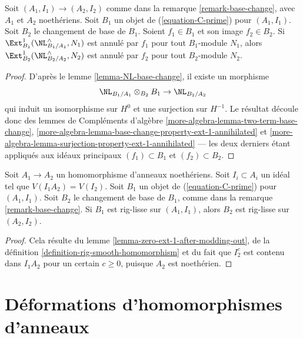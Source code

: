 \begin{lemma}
\label{lemma-zero-ext-1-after-modding-out}
Soit $(A_1, I_1) \to (A_2, I_2)$ comme dans la remarque
\ref{remark-base-change}, avec $A_1$ et $A_2$ noethériens. Soit $B_1$ un objet
de (\ref{equation-C-prime}) pour $(A_1, I_1)$. Soit $B_2$ le changement de
base de $B_1$. Soient $f_1 \in B_1$ et son image $f_2 \in B_2$. Si
$\Ext^1_{B_1}(\NL_{B_1/A_1}^\wedge, N_1)$ est annulé par $f_1$ pour tout
$B_1$-module $N_1$, alors $\Ext^1_{B_2}(\NL_{B_2/A_2}^\wedge, N_2)$ est
annulé par $f_2$ pour tout $B_2$-module $N_2$.
\end{lemma}

\begin{proof}
D'après le lemme \ref{lemma-NL-base-change}, il existe un morphisme
$$
\NL_{B_1/A_1} \otimes_{B_2} B_1 \to \NL_{B_2/A_2}
$$
qui induit un isomorphisme sur $H^0$ et une surjection sur $H^{-1}$. Le
résultat découle donc des lemmes de Compléments d'algèbre
\ref{more-algebra-lemma-two-term-base-change},
\ref{more-algebra-lemma-base-change-property-ext-1-annihilated} et
\ref{more-algebra-lemma-surjection-property-ext-1-annihilated}
--- les deux derniers étant appliqués aux idéaux principaux
$(f_1) \subset B_1$ et $(f_2) \subset B_2$.
\end{proof}

\begin{lemma}
\label{lemma-base-change-rig-smooth-homomorphism}
Soit $A_1 \to A_2$ un homomorphisme d'anneaux noethériens. Soit
$I_i \subset A_i$ un idéal tel que $V(I_1A_2) = V(I_2)$. Soit $B_1$ un objet
de (\ref{equation-C-prime}) pour $(A_1, I_1)$. Soit $B_2$ le changement de
base de $B_1$, comme dans la remarque \ref{remark-base-change}. Si $B_1$ est
rig-lisse sur $(A_1, I_1)$, alors $B_2$ est rig-lisse sur $(A_2, I_2)$.
\end{lemma}

\begin{proof}
Cela résulte du lemme \ref{lemma-zero-ext-1-after-modding-out}, de la
définition \ref{definition-rig-smooth-homomorphism} et du fait que $I_2^c$ est
contenu dans $I_1A_2$ pour un certain $c \geq 0$, puisque $A_2$ est
noethérien.
\end{proof}













\section{Déformations d'homomorphismes d'anneaux}
\label{section-defos-ring-maps}

